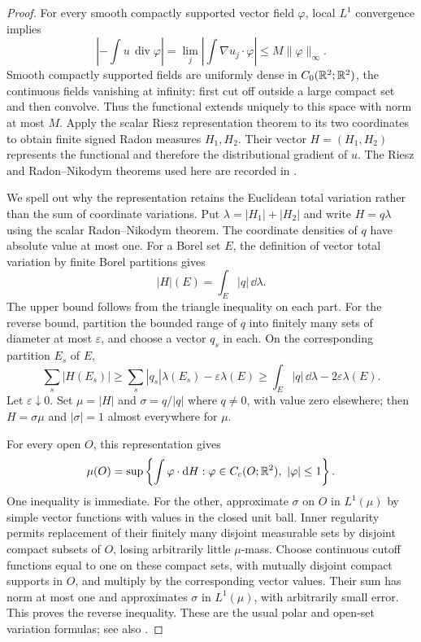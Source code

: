 \begin{proof}
For every smooth compactly supported vector field $\varphi$,
local $L^1$ convergence implies
\[
 \left|-\int u\,\operatorname{div}\varphi\right|
 =\lim_j\left|\int\nabla u_j\cdot\varphi\right|
 \le M\|\varphi\|_\infty.
\]
Smooth compactly supported fields are uniformly dense in
$C_0(\mathbb R^2;\mathbb R^2)$, the continuous fields vanishing at infinity:
first cut off outside a large compact set and then convolve.
Thus the functional extends uniquely to this space with norm
at most $M$. Apply the scalar Riesz representation theorem to
its two coordinates to obtain finite signed Radon measures
$H_1,H_2$. Their vector $H=(H_1,H_2)$ represents the
functional and therefore the distributional gradient of $u$.
The Riesz and Radon--Nikodym theorems used here are recorded in
\cite[Chapter~1, Theorem~5.14 and Equation~(4.17)]{Simon2018}.

We spell out why the representation retains the Euclidean total
variation rather than the sum of coordinate variations. Put
$\lambda=|H_1|+|H_2|$ and write $H=q\lambda$ using the scalar
Radon--Nikodym theorem. The coordinate densities of $q$ have
absolute value at most one. For a Borel set $E$, the definition
of vector total variation by finite Borel partitions gives
\[
 |H|(E)=\int_E|q|\,\dd\lambda.
\]
The upper bound follows from the triangle inequality on each
part. For the reverse bound, partition the bounded range of $q$
into finitely many sets of diameter at most $\varepsilon$, and
choose a vector $q_s$ in each. On the corresponding partition
$E_s$ of $E$,
\[
 \sum_s|H(E_s)|
 \ge\sum_s|q_s|\lambda(E_s)-\varepsilon\lambda(E)
 \ge\int_E|q|\,\dd\lambda-2\varepsilon\lambda(E).
\]
Let $\varepsilon\downarrow0$. Set $\mu=|H|$ and
$\sigma=q/|q|$ where $q\ne0$, with value zero elsewhere;
then $H=\sigma\mu$ and $|\sigma|=1$ almost everywhere for $\mu$.

For every open $O$, this representation gives
\begin{equation}\label{eq:appendix-continuous-variation}
 \mu(O)=\sup\left\{\int\varphi\cdot\mathop{}\!\mathrm{d} H:
          \varphi\in C_c(O;\mathbb R^2),\ |\varphi|\le1\right\}.
\end{equation}
One inequality is immediate. For the other, approximate $\sigma$
on $O$ in $L^1(\mu)$ by simple vector functions with values in
the closed unit ball. Inner regularity permits replacement of
their finitely many disjoint measurable sets by disjoint compact
subsets of $O$, losing arbitrarily little $\mu$-mass. Choose
continuous cutoff functions equal to one on these compact sets,
with mutually disjoint compact supports in $O$, and multiply by
the corresponding vector values. Their sum has norm at most
one and approximates $\sigma$ in $L^1(\mu)$, with arbitrarily
small error. This proves the reverse inequality. These are the
usual polar and open-set variation formulas; see also
\cite[Chapter~2, Equations~(2.1)--(2.4)]{Simon2018}.


\end{proof}
